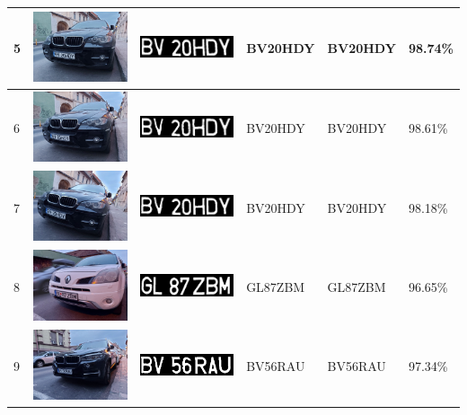 \documentclass[a4paper,12pt]{report}
\begin{document}
\begin{longtable}{| m{0.6cm} | m{3cm} | m{3cm} | m{1.8cm} | m{1.8cm} | m{1.8cm} |}
        5 & \includegraphics[width=3cm,keepaspectratio]{dataset/2_d1.jpg} & \includegraphics[width=3cm,keepaspectratio]{segmentari/5.jpg} & BV20HDY & BV20HDY & 98.74\% \\ \hline
        6 & \includegraphics[width=3cm,keepaspectratio]{dataset/2_d2.jpg} & \includegraphics[width=3cm,keepaspectratio]{segmentari/6.jpg} & BV20HDY & BV20HDY & 98.61\% \\ \hline
        7 & \includegraphics[width=3cm,keepaspectratio]{dataset/2_d3.jpg} & \includegraphics[width=3cm,keepaspectratio]{segmentari/7.jpg} & BV20HDY & BV20HDY & 98.18\% \\ \hline
        8 & \includegraphics[width=3cm,keepaspectratio]{dataset/3_d1.jpg} & \includegraphics[width=3cm,keepaspectratio]{segmentari/8.jpg} & GL87ZBM & GL87ZBM & 96.65\% \\ \hline
        9 & \includegraphics[width=3cm,keepaspectratio]{dataset/4_d1.jpg} & \includegraphics[width=3cm,keepaspectratio]{segmentari/9.jpg} & BV56RAU & BV56RAU & 97.34\% \\ \hline

\end{longtable}
\end{document}
